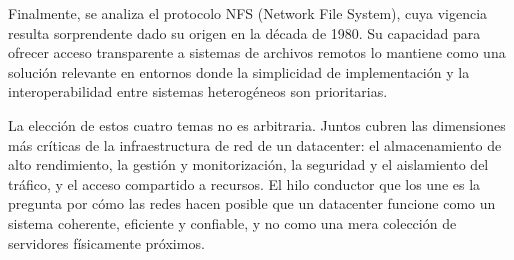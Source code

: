 \documentclass[12pts, a4paper]{book}
\begin{document}
	Finalmente, se analiza el protocolo NFS (Network File System), cuya vigencia resulta sorprendente dado su origen en la década de 1980. Su capacidad para ofrecer acceso transparente a sistemas de archivos remotos lo mantiene como una solución relevante en entornos donde la simplicidad de implementación y la interoperabilidad entre sistemas heterogéneos son prioritarias.
	
	La elección de estos cuatro temas no es arbitraria. Juntos cubren las dimensiones más críticas de la infraestructura de red de un datacenter: el almacenamiento de alto rendimiento, la gestión y monitorización, la seguridad y el aislamiento del tráfico, y el acceso compartido a recursos. El hilo conductor que los une es la pregunta por cómo las redes hacen posible que un datacenter funcione como un sistema coherente, eficiente y confiable, y no como una mera colección de servidores físicamente próximos.
\end{document}
